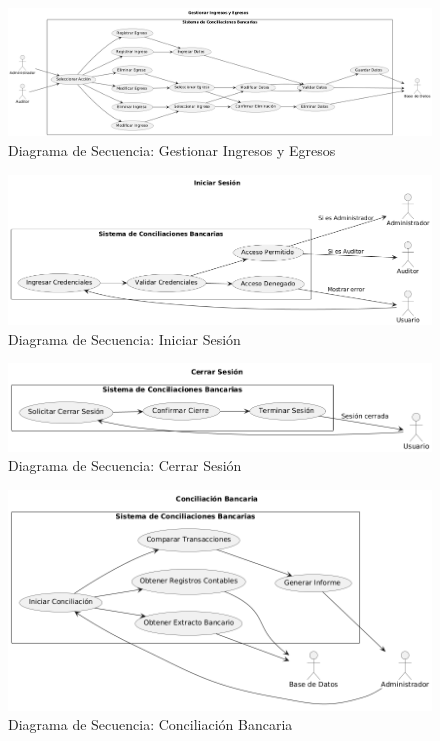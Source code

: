 \documentclass{article}
\begin{document}
\begin{figure}[H]
    \centering
    \includegraphics[width=\textwidth]{casos/GestionarIngresosEgresos.png}
    \caption{Diagrama de Secuencia: Gestionar Ingresos y Egresos}
\end{figure}

\begin{figure}[H]
    \centering
    \includegraphics[width=\textwidth]{casos/IniciarSesion.png}
    \caption{Diagrama de Secuencia: Iniciar Sesión}
\end{figure}

\begin{figure}[H]
    \centering
    \includegraphics[width=\textwidth]{casos/CerrarSesion.png}
    \caption{Diagrama de Secuencia: Cerrar Sesión}
\end{figure}

\begin{figure}[H]
    \centering
    \includegraphics[width=\textwidth]{casos/ConciliacionBancaria.png}
    \caption{Diagrama de Secuencia: Conciliación Bancaria}
\end{figure}
\end{document}
